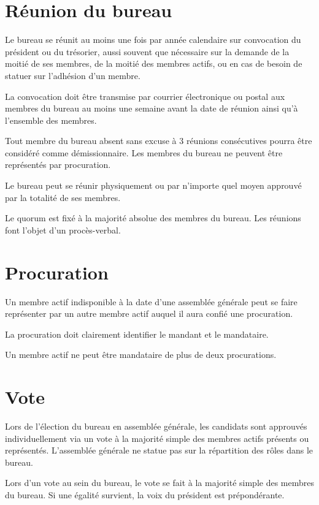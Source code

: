 \documentclass[a4paper, 11pt]{article}
\begin{document}

\section{Réunion du bureau} %

Le bureau se réunit au moins une fois par année calendaire sur convocation du président ou du trésorier, aussi souvent
que nécessaire sur la demande de la moitié de ses membres, de la moitié des membres actifs, ou en cas de besoin de
statuer sur l'adhésion d'un membre.

La convocation doit être transmise par courrier électronique ou postal aux membres du bureau au moins une semaine avant
la date de réunion ainsi qu'à l'ensemble des membres.

Tout membre du bureau absent sans excuse à 3 réunions consécutives pourra être considéré comme démissionnaire.
Les membres du bureau ne peuvent être représentés par procuration.

Le bureau peut se réunir physiquement ou par n'importe quel moyen approuvé par la totalité de ses membres.

Le quorum est fixé à la majorité absolue des membres du bureau.
Les réunions font l'objet d'un procès-verbal.


\section{Procuration} %

Un membre actif indisponible à la date d'une assemblée générale peut se faire représenter par un autre membre actif
auquel il aura confié une procuration.

La procuration doit clairement identifier le mandant et le mandataire.

Un membre actif ne peut être mandataire de plus de deux procurations.


\section{Vote} %

Lors de l'élection du bureau en assemblée générale, les candidats sont approuvés individuellement via un vote à
la majorité simple des membres actifs présents ou représentés.
L'assemblée générale ne statue pas sur la répartition des rôles dans le bureau.

Lors d'un vote au sein du bureau, le vote se fait à la majorité simple des membres du bureau.
Si une égalité survient, la voix du président est prépondérante.
\end{document}
